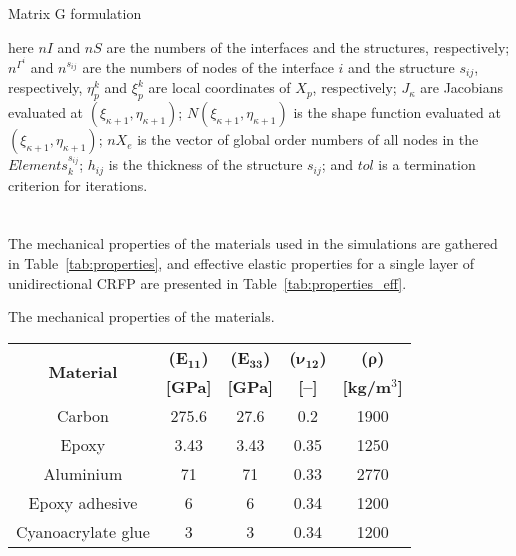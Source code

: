 \documentclass[sensors,article,accept,moreauthors,pdftex]{Definitions/mdpi}
\begin{document}
\begin{paracol}{2}
\begin{algorithm}
{{		}
	}
	
	\caption{Matrix G formulation}
	\label{alg:G_matrix}
\end{algorithm}
here \(nI\) and \(nS\) are the numbers of the interfaces and the structures, respectively; \(n^{\Gamma^i}\) and \(n^{s_{ij}}\) are the numbers of nodes of the interface \(i\) and the structure \(s_{ij}\), respectively, \(\eta^k_p\) and  \(\xi^k_p\) are local coordinates of \(X_p\), respectively;  \(J_{\kappa}\) are Jacobians evaluated at \((\xi_{\kappa+1},\eta_{\kappa+1})\); \(N(\xi_{\kappa+1},\eta_{\kappa+1})\) is the shape function evaluated at \((\xi_{\kappa+1},\eta_{\kappa+1})\); \(nX_e\) is the vector of global order numbers of all nodes in the \(Elements^{s_{ij}}_k\); \(h_{ij}\) is the thickness of the structure \(s_{ij}\); and \(tol\) is a termination criterion for iterations.
\section{}
\label{app:properties}
The mechanical properties of the materials used in the simulations are gathered in Table~\ref{tab:properties}, and effective elastic properties for a single layer of unidirectional CRFP are presented in Table~\ref{tab:properties_eff}.
\appendix
\vspace{-6pt}
\begin{specialtable}[H]
\small
\tabcolsep=0.75cm
	\caption{\label{tab:properties}The mechanical properties of the materials.}
	\begin{tabular}{ccccc}\toprule
		\multirow{2}{*}{\textbf{Material}} & \textbf{(}$\boldsymbol{E_{11}}$\textbf{)} &  \textbf{(}$\boldsymbol{E_{33}}$\textbf{)} & \textbf{(}$\boldsymbol{\nu_{12}}$\textbf{)} & \textbf{(}$\boldsymbol{\rho}$\textbf{)} \\
		& \textbf{[GPa]} &  \textbf{[GPa]} & \textbf{[--]} & \textbf{[kg/m\(^3\)]}\\
		\midrule
		Carbon & 275.6 & 27.6 & 0.2 & 1900\\
		Epoxy & 3.43 & 3.43 & 0.35 & 1250\\
		Aluminium & 71 & 71 & 0.33 & 2770\\
		Epoxy adhesive & 6 & 6 & 0.34 & 1200\\
		Cyanoacrylate glue & 3 & 3 & 0.34 & 1200\\		
		\bottomrule
	\end{tabular}
\end{specialtable}
\end{paracol}
\end{document}
